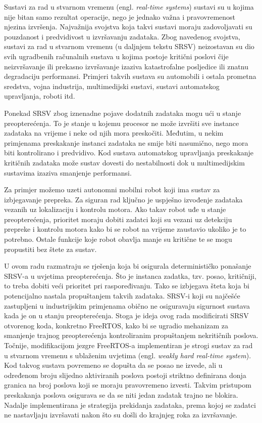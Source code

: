 \documentclass[../zavrsni.tex]{subfiles}
\begin{document}
\sloppy

\justifying



Sustavi za rad u stvarnom vremenu (engl. \textit{real-time systems}) sustavi su u kojima nije bitan samo
rezultat operacije, nego je jednako važna i pravovremenost njezina izvršenja. Najvažnija svojstva koja takvi sustavi moraju
zadovoljavati su pouzdanost i predvidivost u izvršavanju zadataka.
Zbog navedenog svojstva, sustavi za rad u stvarnom vremenu (u daljnjem tekstu SRSV) neizostavan su dio svih ugradbenih 
računalnih sustava u kojima postoje kritični poslovi čije neizvršavanje ili prekasno izvršavanje izaziva katastrofalne
posljedice ili znatnu degradaciju performansi. Primjeri takvih sustava su automobili i ostala prometna sredstva, vojna industrija, 
multimedijski sustavi, sustavi automatskog upravljanja, roboti itd. 

Ponekad SRSV zbog iznenadne pojave dodatnih zadataka mogu ući u stanje preopterećenja. To je stanje u kojemu procesor ne može 
izvršiti sve instance zadataka na vrijeme i neke od njih mora preskočiti. Međutim, u nekim primjenama preskakanje instanci zadataka ne smije biti nasumično, nego
mora biti kontrolirano i predvidivo. Kod sustava automatskog upravljanja preskakanje kritičnih zadataka može sustav dovesti do nestabilnosti dok u 
multimedijskim sustavima izaziva smanjenje performansi.
  
Za primjer možemo uzeti autonomni mobilni robot koji ima sustav za izbjegavanje prepreka. Za siguran rad ključno je uspješno izvođenje zadataka
vezanih uz lokalizaciju i kontrolu motora. Ako takav robot uđe u stanje preopterećenja, prioritet 
moraju dobiti zadatci koji su vezani uz detekciju prepreke i kontrolu motora kako bi se robot na vrijeme zaustavio ukoliko je to potrebno.
Ostale funkcije koje robot obavlja manje su kritične te se mogu propustiti bez štete za sustav.

U ovom radu razmatraju se rješenja koja bi osigurala determinističko ponašanje SRSV-a u uvjetima preopterećenja. Što je instanca zadatka, tzv. posao, kritičniji,
to treba dobiti veći prioritet pri raspoređivanju. Tako se izbjegava šteta koja bi potencijalno nastala propuštanjem takvih zadataka. 
SRSV-i koji su najčešće zastupljeni u industrijskim primjenama obično ne osiguravaju sigurnost sustava kada je on u stanju preopterećenja. Stoga je ideja ovog rada 
modificirati SRSV otvorenog koda, konkretno FreeRTOS, kako bi se ugradio mehanizam za smanjenje trajnog preopterećenja kontroliranim 
propuštanjem nekritičnih poslova. Točnije,  
modifikacijom jezgre FreeRTOS-a implementiran je strogi sustav za rad u stvarnom vremenu s ublaženim uvjetima (engl. \textit{weakly hard real-time system}). Kod takvog sustava
povremeno se dopušta da se posao ne izvede, ali u određenom broju slijedno aktiviranih poslova postoji striktno definirana donja granica na broj 
poslova koji se moraju pravovremeno izvesti.
Takvim pristupom preskakanja poslova osigurava se da se niti jedan zadatak trajno ne blokira. Nadalje implementirana je strategija 
prekidanja zadataka, prema kojoj se zadatci ne nastavljaju izvršavati nakon što su došli do krajnjeg roka za izvršavanje.
\end{document}
